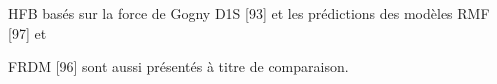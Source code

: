 \documentclass[a4paper]{article}
\begin{document}
HFB basés sur la force de Gogny D1S [93] et les prédictions des modèles RMF [97] et

FRDM [96] sont aussi présentés à titre de comparaison.


\bigskip


\bigskip


\bigskip


\bigskip


\bigskip


\bigskip


\bigskip


\bigskip


\bigskip


\bigskip


\bigskip


\bigskip


\bigskip


\bigskip


\bigskip


\bigskip


\bigskip


\bigskip


\bigskip


\bigskip


\bigskip


\bigskip


\bigskip


\bigskip


\bigskip


\bigskip


\bigskip


\bigskip


\bigskip


\bigskip


\bigskip


\bigskip


\bigskip


\bigskip


\bigskip


\bigskip


\bigskip


\bigskip


\bigskip


\bigskip


\bigskip


\bigskip


\bigskip


\bigskip


\bigskip


\bigskip


\bigskip
\end{document}
